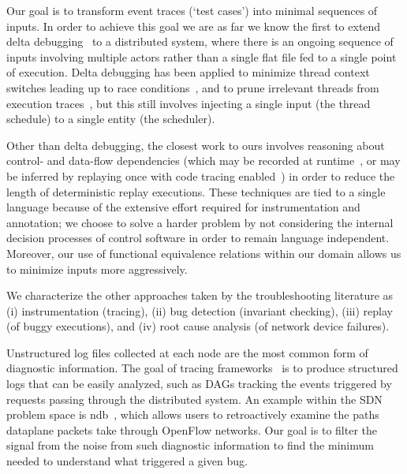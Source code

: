 Our goal is to transform
event traces (`test cases') into minimal sequences of inputs.
In order to achieve this goal we are as far we know the first to
extend delta debugging~\cite{Zeller:1999:YMP:318773.318946,Zeller:2002:SIF:506201.506206}
to a distributed system, where there is an ongoing sequence of inputs
involving multiple actors rather than a single flat file fed to a single point of
execution. Delta debugging has been applied to minimize thread context switches
leading up to race conditions~\cite{choi2002isolating}, and to
prune irrelevant threads from execution traces~\cite{huang2012lean}, but this still
involves injecting a single input (the thread schedule) to a single entity (the
scheduler).

Other than delta debugging, the closest work to ours involves reasoning about
control- and data-flow dependencies
(which may be recorded at runtime~\cite{Lee:2011:TGR:1993498.1993528}, or
may be inferred by replaying once with code tracing enabled~\cite{tallam2007enabling})
in order to reduce the length of deterministic replay executions. These
techniques are tied to a single language because of the extensive effort
required for instrumentation and annotation; we choose to solve a harder
problem by not considering the internal decision processes of control
software in order to remain language independent. Moreover, our use of
functional equivalence relations within our domain allows us to minimize
inputs more aggressively.

We characterize the other approaches taken by the troubleshooting literature
as (i) instrumentation (tracing),
(ii) bug detection (invariant checking),
(iii) replay (of buggy executions), and
(iv) root cause analysis (of network device failures).

\vspace{0.05in}
 Unstructured
log files collected at each node are the most common form of diagnostic information. The goal of
tracing
frameworks~\cite{pip,fonseca2007x,Chen02pinpoint:problem,ndb14,barham2004using}
is to produce structured logs that can be easily analyzed, such as DAGs tracking the events triggered by
requests passing through the distributed system. An example within the SDN
problem space is ndb~\cite{ndb14}, which
allows users to retroactively examine the paths dataplane packets
take through OpenFlow networks. Our goal is to filter the signal from the
noise from such diagnostic information to find the minimum needed
to understand what triggered a given bug.

